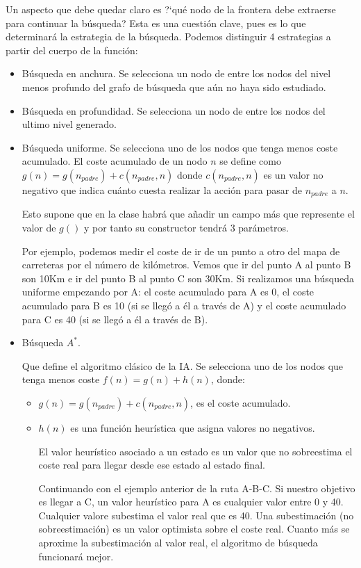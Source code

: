 Un aspecto que debe quedar claro es ?`qué nodo de la frontera debe extraerse para continuar la búsqueda? Esta es una cuestión clave, pues es lo que determinará la estrategia de la búsqueda.
Podemos distinguir 4 estrategias a partir del cuerpo de la función:
\begin{itemize}
\item Búsqueda en anchura. 
Se selecciona un nodo de entre los nodos del nivel menos profundo  del grafo de búsqueda que aún no haya sido estudiado.

\item Búsqueda en profundidad.
Se selecciona un nodo de entre los nodos del ultimo nivel generado.

\item Búsqueda uniforme.
Se selecciona uno de los nodos que tenga menos coste acumulado.
El coste acumulado de un nodo $n$ se define como $g(n)=g(n_{padre})+c(n_{padre}, n)$  donde $c(n_{padre}, n)$ es un valor no negativo que indica cuánto cuesta realizar la acción para pasar de $n_{padre}$ a $n$.

Esto supone que en la clase  habrá que añadir un campo más que represente el valor de $g()$ y por tanto su constructor tendrá 3 parámetros.

Por ejemplo, podemos medir el coste de ir de un punto a otro del mapa de carreteras por el número de kilómetros. Vemos que ir del punto A al punto  B son 10Km e ir del punto B al punto C son 30Km. Si realizamos una búsqueda uniforme empezando por A: el coste acumulado para A es 0, el coste acumulado para B es 10 (si se llegó a él a través de A) y el coste acumulado para C es 40 (si se llegó a él a través de B).


\item Búsqueda $A^*$.

Que define el algoritmo clásico de la IA.
Se selecciona uno de los nodos que tenga menos coste $f(n) = g(n) + h(n)$, donde:
\begin{itemize}
\item $g(n)=g(n_{padre})+c(n_{padre}, n)$, es el coste acumulado.
\item $h(n)$ es una función heurística que asigna valores no negativos.

El valor heurístico asociado a un estado es un valor que no sobreestima el coste real para llegar desde ese estado al estado final. 

Continuando con el ejemplo anterior de la ruta A-B-C.
Si nuestro objetivo es llegar a C, un valor heurístico para A  es cualquier valor entre 0 y 40. Cualquier valore subestima el valor real que es 40. Una subestimación (no sobreestimación) es un valor optimista sobre el coste real. Cuanto más se aproxime la subestimación al valor real, el algoritmo de búsqueda funcionará mejor. 


\end{itemize}
\end{itemize}
